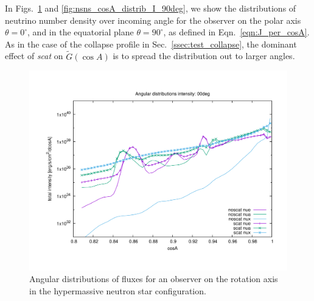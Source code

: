\documentclass[aps,floatfix,prd,superscriptaddress,twocolumn]{revtex4-1}
\newcommand{\todo}[1]{\marginpar{\tiny{\textcolor{red}{#1}}}}
\renewcommand\todo[1]{} %
\begin{document}
In Figs.~\ref{fig:nsns_cosA_distrib_I_00deg}
and \ref{fig:nsns_cosA_distrib_I_90deg}, we show the distributions of neutrino
number density over incoming angle
for the observer on the polar axis $\theta=0^\circ$,
and in the equatorial plane $\theta=90^\circ$,
as defined in Eqn.~\ref{eqn:J_per_cosA}.
As in the case of the collapse profile in Sec.~\ref{ssec:test_collapse},
the dominant effect of \emph{scat} on $\tilde{G}(\cos A)$
is to spread the distribution out to larger angles.
\todo{also examine spectra or average energies}

\begin{figure}
  \includegraphics[width=\columnwidth]{cosA_distrib-intensity-250km-00deg}
  \caption{Angular distributions of fluxes for an observer on the rotation axis
    in the hypermassive neutron star configuration.}
  \label{fig:nsns_cosA_distrib_I_00deg}
\end{figure}
\end{document}
